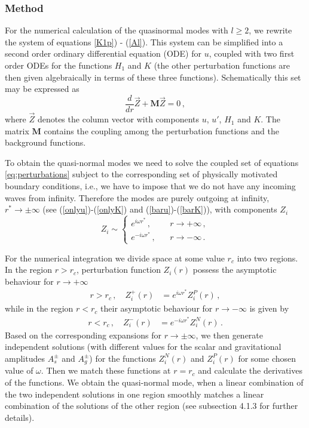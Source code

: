 \documentclass[a4paper,12pt]{article}
\newcommand{\be}{\begin{equation}}
\newcommand{\ee}{\end{equation}}
\begin{document}
\subsubsection{Method}

For the numerical calculation of the quasinormal modes with $l\ge 2$, we rewrite the system of equations \ref{K1p}) - (\ref{Al}). %
This system can be simplified into a second order ordinary differential equation (ODE) for $u$, coupled with two first order ODEs  for the functions $H_1$ and $K$ (the other perturbation functions are then given algebraically in terms of these three functions).
%
Schematically this set may be expressed as 
%
\be
\frac{d}{dr}{\vec{Z}}+\mathbf{M}\vec{Z}=0\,,
\label{eq:perturbations}
\ee
%
where $\vec Z$ denotes the column vector with components $u$, $u'$, $H_1$ and $K$. 
The matrix $\mathbf{M}$ contains the coupling among the perturbation functions and the background functions. 

To obtain the quasi-normal modes we need to solve the coupled set of equations
\eqref{eq:perturbations} subject to the corresponding set of physically motivated boundary conditions,
i.e., we have to impose that we do not have any incoming waves from infinity. Therefore the modes are purely outgoing at infinity, $r^* \to \pm\infty$ (see (\ref{onlyu})-(\ref{onlyK}) and (\ref{baru})-(\ref{barK})), with components $Z_i$
\be Z_i \sim \left\{ 
\begin{array}{cc}
 e^{i \omega r^*}\,, &
 \ \ \ \ r\to + \infty \,, \\
 e^{-i \omega r^*}\,, &
 \ \ \ \ r\to - \infty \,.
 \end{array} \right.
\ee


For the numerical integration we divide space at some value $r_c$ into two regions.
In the region $r>r_c$, perturbation function $Z_i(r)$ possess the asymptotic behaviour for $r \to +\infty$ \cite{Chandrasekhar:1985kt}
%
\begin{align}
r>r_c \,, \quad  Z_i^+(r) &=  e^{i \omega r^{*}} Z_i^P(r)  \,,
\end{align}
while in the region $r<r_c$ their asymptotic behaviour for $r \to -\infty$ is given by
% 
\begin{align}
r<r_c \,, \quad  Z_i^-(r) &=  e^{-i \omega r^{*}} Z_i^N(r)  \,.
\end{align}
Based on the corresponding expansions for $r \to \pm \infty$, we then generate independent solutions (with different values for the scalar and gravitational amplitudes $A_s^\pm$ and $A_g^\pm$) for the functions $Z_i^N(r)$ and $Z_i^P(r)$ for some chosen value of $\omega$.
Then we match these functions at $r=r_c$ and calculate the derivatives of the functions.
We obtain the quasi-normal mode, when a linear combination of the two independent solutions in one region smoothly matches a linear combination of the solutions of the other region (see subsection 4.1.3 for further details).
\end{document}
